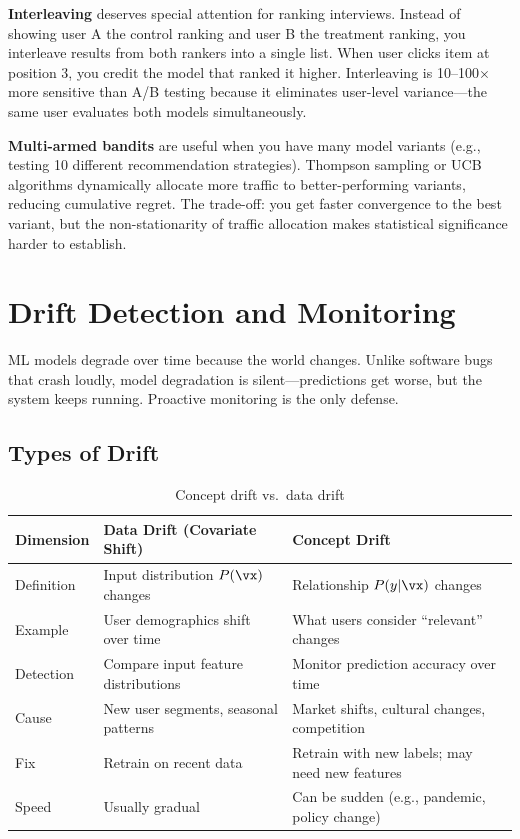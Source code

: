 \textbf{Interleaving} deserves special attention for ranking interviews. Instead of showing user A the control ranking and user B the treatment ranking, you interleave results from both rankers into a single list. When user clicks item at position 3, you credit the model that ranked it higher. Interleaving is 10--100$\times$ more sensitive than A/B testing because it eliminates user-level variance---the same user evaluates both models simultaneously.

\textbf{Multi-armed bandits} are useful when you have many model variants (e.g., testing 10 different recommendation strategies). Thompson sampling or UCB algorithms dynamically allocate more traffic to better-performing variants, reducing cumulative regret. The trade-off: you get faster convergence to the best variant, but the non-stationarity of traffic allocation makes statistical significance harder to establish.

\section{Drift Detection and Monitoring}
\label{sec:drift_monitoring}

ML models degrade over time because the world changes. Unlike software bugs that crash loudly, model degradation is silent---predictions get worse, but the system keeps running. Proactive monitoring is the only defense.

\subsection{Types of Drift}

\begin{table}[H]
\centering
\caption{Concept drift vs.\ data drift}
\begin{tabularx}{\textwidth}{lXX}
\toprule
\textbf{Dimension} & \textbf{Data Drift (Covariate Shift)} & \textbf{Concept Drift} \\
\midrule
Definition & Input distribution $P(\vx)$ changes & Relationship $P(y|\vx)$ changes \\
Example & User demographics shift over time & What users consider ``relevant'' changes \\
Detection & Compare input feature distributions & Monitor prediction accuracy over time \\
Cause & New user segments, seasonal patterns & Market shifts, cultural changes, competition \\
Fix & Retrain on recent data & Retrain with new labels; may need new features \\
Speed & Usually gradual & Can be sudden (e.g., pandemic, policy change) \\
\bottomrule
\end{tabularx}
\end{table}

